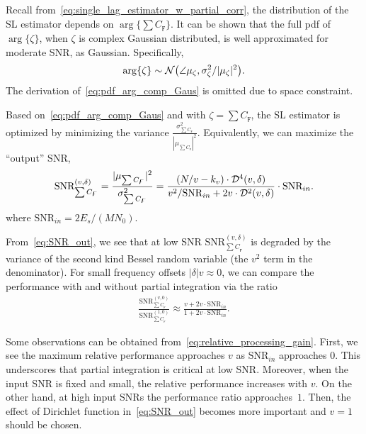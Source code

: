 Recall from~\eqref{eq:single_lag_estimator_w_partial_corr},
the distribution of the SL estimator depends on
$\arg\{\sum C_{\digamma} \}$.
It can be shown that the full pdf of $\arg\{\zeta\}$, when $\zeta$ is
complex Gaussian distributed, is well approximated for moderate SNR,
as Gaussian. 
Specifically,
\begin{equation}
  \label{eq:pdf_arg_comp_Gaus}
  \arg\{\zeta\} \sim \mathcal{N}\big(\angle \mu_{\zeta},\sigma^2_{\zeta}/|\mu_{\zeta}|^2\big).
\end{equation}
The derivation of~\eqref{eq:pdf_arg_comp_Gaus} is omitted due to space constraint.

Based on~\eqref{eq:pdf_arg_comp_Gaus} and with
$\zeta = \sum C_{\digamma}$,
the SL estimator is optimized by minimizing the
variance $\frac{\sigma^2_{\sum C_{\digamma}}}{|\mu_{\sum C_{\digamma}}|^2}$.
Equivalently, we can maximize the ``output'' SNR, 
\begin{equation}
  \begin{aligned}
    \label{eq:SNR_out}
    \text{SNR}_{\sum C_{\digamma}}^{(v,\delta)}=\frac{|\mu_{\sum C_{\digamma}}|^2}{\sigma^2_{\sum C_{\digamma}}} 
    =\frac{(N/v-k_v)\cdot\mathcal{D}^4(v,\delta)}
    {v^2/\text{SNR}_{in}+2v\cdot\mathcal{D}^2(v,\delta)}\cdot\text{SNR}_{in}. \\
  \end{aligned}
\end{equation}
where $\text{SNR}_{in}=2E_s/(MN_0)$.

From~\eqref{eq:SNR_out}, we 
see that  at low SNR $\text{SNR}_{\sum C_{\digamma}}^{(v,\delta)}$ is degraded by
the variance of the second kind Bessel random variable (the $v^2$ term
in the denominator).
For small frequency offsets  $|\delta|v \approx 0$,
we can compare the performance
with and without partial integration via the ratio
\begin{equation}
  \begin{aligned}
    \label{eq:relative_processing_gain}
    \frac{\text{SNR}_{\sum C_{\digamma}}^{(v,0)}}{\text{SNR}_{\sum C_{\digamma}}^{(1,0)}}
    \approx\frac{v+2v\cdot\text{SNR}_{in}}{1+2v\cdot\text{SNR}_{in}}.
  \end{aligned}
\end{equation}

Some observations can be obtained from~\eqref{eq:relative_processing_gain}.
First, we see the maximum relative performance approaches $v$ as
$\text{SNR}_{in}$ approaches 0.
This underscores that partial integration is critical at low SNR.
Moreover, when the input SNR is fixed and small, the relative performance
increases with $v$.
On the other hand, at high input SNRs the performance ratio approaches~$1$.
Then, the effect of Dirichlet function in~\eqref{eq:SNR_out}
becomes more important and
$v=1$ should be chosen.

